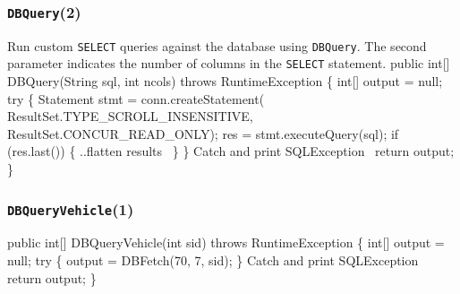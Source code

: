 \documentclass{article}
\def\nwendcode{\endtrivlist \endgroup}
\let\nwdocspar=\par
\theoremstyle{definition}
\begin{document}
\subsubsection{{\tt{}DBQuery}(2)}
Run custom {\tt{}SELECT} queries against the database using
{\tt{}DBQuery}. The second parameter indicates the number of columns in the
{\tt{}SELECT} statement.
\nwenddocs{}\endmoddef{}
public int[] DBQuery(String sql, int ncols) throws RuntimeException \{
  int[] output = null;
  try \{
    Statement stmt = conn.createStatement(
      ResultSet.TYPE_SCROLL_INSENSITIVE, ResultSet.CONCUR_READ_ONLY);
    res = stmt.executeQuery(sql);
    if (res.last()) \{
      \LA{}..flatten results~{\nwtagstyle{}}\RA{}
    \}
  \}
  \LA{}Catch and print \code{}SQLException\edoc{}~{\nwtagstyle{}}\RA{}
  return output;
\}
\nwendcode{}%

\subsubsection{{\tt{}\protect{}\protect{}DBQueryVehicle}(1)}
\nwenddocs{}\endmoddef{}
public int[] DBQueryVehicle(int sid) throws RuntimeException \{
  int[] output = null;
  try \{
    output = DBFetch(70, 7, sid);
  \}
  \LA{}Catch and print \code{}SQLException\edoc{}~{\nwtagstyle{}}\RA{}
  return output;
\}
\eatline
{}\nwendcode{}\nwdocspar
\end{document}
